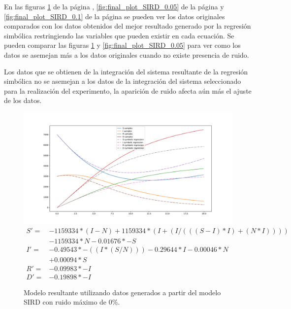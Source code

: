 En las figuras \ref{fig:final_plot_SIRD_0.0} de la página \pageref{fig:final_plot_SIRD_0.0}, \ref{fig:final_plot_SIRD_0.05} de la página \pageref{fig:final_plot_SIRD_0.05} y \ref{fig:final_plot_SIRD_0.1} de la página \pageref{fig:final_plot_SIRD_0.1} se pueden ver los datos originales comparados con los datos obtenidos del mejor resultado generado por la regresión simbólica restringiendo las variables que pueden existir en cada ecuación. Se pueden comparar las figuras \ref{fig:final_plot_SIRD_0.0} y \ref{fig:final_plot_SIRD_0.05} para ver como los datos se asemejan más a los datos originales cuando no existe presencia de ruido.

Los datos que se obtienen de la integración del sistema resultante de la regresión simbólica no se asemejan a los datos de la integración del sistema seleccionado para la realización del experimento, la aparición de ruido afecta aún más el ajuste de los datos.

\begin{figure}[h]
    \centering
    \includegraphics[width=\textwidth]{"figures/final_plot_SIRD_0.0.pdf"}
    \begin{align*}
        S' = & -1159334 * (I - N) + 1159334 * (I + (I / (((S - I) * I) + (N * I)))) \\
             & -1159334 * N -0.01676 * -S                                           \\
        I' = & -0.49543 * -((I * (S / N))) -0.29644 * I -0.00046 * N                \\
             & + 0.00094 * S                                                        \\
        R' = & -0.09983 * -I                                                        \\
        D' = & -0.19898 * -I
    \end{align*}
    \caption{Modelo resultante utilizando datos generados a partir del modelo SIRD con ruido máximo de 0\%.}
    \label{fig:final_plot_SIRD_0.0}
\end{figure}

